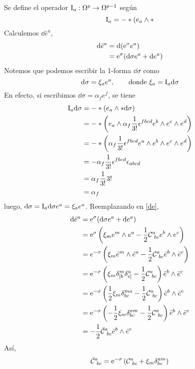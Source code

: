 Se define el operador $\mathrm{I}_a:\Omega^p\to \Omega^{p-1}$ según \cite{Izaurieta:2020kuy}
\begin{equation}
  \mathrm{I} _a=-*(e_a\wedge *
\end{equation}
Calculemos $\dd\bar{e}^{a}$,
\begin{align}
  \dd \bar{e}^{a}&=\dd (\mathrm{e} ^\sigma e^{a})\\
  &=\mathrm{e} ^\sigma (\dd \sigma e^{a}+\dd e^{a}) \label{de}
\end{align}
Notemos que podemos escribir la 1-forma $\dd\sigma$ como
\begin{equation}
  \dd\sigma = \xi_a e^{a},\qquad \text{donde } \xi_a=\mathrm{I}_a\dd\sigma
\end{equation}
En efecto, si escribimos $\dd\sigma=\alpha_f e^{f}$, se tiene
\begin{align}
  \mathrm{I}_a\dd\sigma&=-*(e_a\wedge *\dd\sigma)\\
  &=-*\left(e_a\wedge \alpha_f\frac{1}{3!}\epsilon^{fbcd}e^b\wedge e^c\wedge e^d\right)\\
  &=-*\left(\alpha_f\frac{1}{3!}\epsilon^{fbcd}e^{a}\wedge e^b\wedge e^c\wedge e^d\right)\\
  &=-\alpha_f\frac{1}{3!}\epsilon^{fbcd}\epsilon_{abcd}\\
  &=\alpha_f\frac{1}{3!}3!\\
  &=\alpha_f
\end{align}
luego, $\dd \sigma = \mathrm{I}_a\dd \sigma e^{a}=\xi_a e^{a}$. Reemplazando en \eqref{de},
\begin{align}
  \dd\bar{e}^{a}&=\mathrm{e}^\sigma (\dd\sigma e^{a}+\dd e^{a})\\
  &=\mathrm{e}^\sigma\left(\xi_me^m\wedge e^{a}-\frac{1}{2}\mathcal{C}^{a}_{~bc}e^b\wedge e^c\right)\\
  &=e^{-\sigma}\left(\xi_m\bar{e}^m\wedge \bar{e}^{a}-\frac{1}{2}\mathcal{C}^{a}_{~bc}\bar{e}^b\wedge\bar{e}^c\right)\\
  &=\mathrm{e}^{-\sigma}\left(\xi_m\delta^m_{[b}\delta^{a}_{c]}-\frac{1}{2}\mathcal{C}^{a}_{~bc}\right)\bar{e}^b\wedge \bar{e}^c\\
  &=\mathrm{e}^{-\sigma}\left(\frac{1}{2}\xi_m\delta^{ma}_{bc}-\frac{1}{2}\mathcal{C}^{a}_{~bc}\right)\bar{e}^b\wedge \bar{e}^c\\
  &=\mathrm{e}^{-\sigma}\left(-\frac{1}{2}\xi_m\delta^{am}_{bc}-\frac{1}{2}\mathcal{C}^{a}_{~bc}\right)\bar{e}^b\wedge \bar{e}^c\\
  &=-\frac{1}{2}\bar{\mathcal{C}}^{a}_{~bc}\bar{e}^b\wedge \bar{e}^c
\end{align}
Así,
\begin{equation}
  \bar{\mathcal{C}}^{a}_{~bc}=\mathrm{e}^{-\sigma} \left(\mathcal{C}^{a}_{~bc}+\xi_m\delta^{am}_{bc}\right)
\end{equation}

